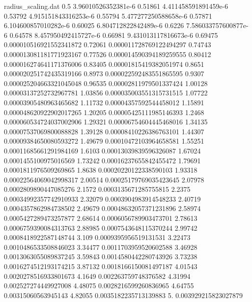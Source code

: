 \begin{filecontents}{radius_scaling.dat}
0.5	3.96010526352381e-6
0.51861	4.411458591891459e-6
0.53792	4.915151843316253e-6
0.55794	5.477277250588658e-6
0.57871	6.104600857010282e-6
0.60025	6.804712822842489e-6
0.6226	7.586033757600877e-6
0.64578	8.457950492415727e-6
0.66981	9.431013117816673e-6
0.69475	0.000010516921552341872
0.72061	0.000011728769122494297
0.74743	0.000013081181771923167
0.77526	0.000014590394189259555
0.80412	0.000016274641171376006
0.83405	0.00001815419382051974
0.8651	0.000020251742435319166
0.8973	0.000022592483551865595
0.9307	0.000025204663321045048
0.96535	0.00002811979501337424
1.00128	0.00003137252732967781
1.03856	0.000035003551315731515
1.07722	0.00003905480963465682
1.11732	0.00004357592544458012
1.15891	0.000048620922902017265
1.20205	0.00005425111985146393
1.2468	0.000060534724037002906
1.29321	0.00006754604445468016
1.34135	0.00007537069800088828
1.39128	0.00008410226386763101
1.44307	0.00009384650080593272
1.49679	0.00010472103964658581
1.55251	0.00011685661291984169
1.6103	0.00013039839596326087
1.67024	0.0001455100975016569
1.73242	0.00016237655842455472
1.79691	0.0001811976509269865
1.8638	0.00020220122338590103
1.93318	0.00022564069042998317
2.00514	0.00025179769035423645
2.07978	0.0002809890447085276
2.1572	0.0003135671285755815
2.2375	0.00034992357742910933
2.32079	0.0003904983914548233
2.40719	0.0004357862984738502
2.49679	0.00048632057371231896
2.58974	0.0005427289473257877
2.68614	0.0006056789903473701
2.78613	0.0006759390084313763
2.88985	0.0007543648115370244
2.99742	0.0008418922587148744
3.109	0.0009395956519131531
3.22473	0.0010486533508846023
3.34477	0.0011703959520602588
3.46928	0.0013063055089837245
3.59843	0.0014580442280743926
3.73238	0.0016274512193174215
3.87132	0.0018166150081497187
4.01543	0.0020278516933801673
4.1649	0.002263759748376582
4.31994	0.002527274449927008
4.48075	0.0028216599260836965
4.64755	0.00315060563945143
4.82055	0.0035182235713139883
5.	0.003929215823027879
\end{filecontents}

